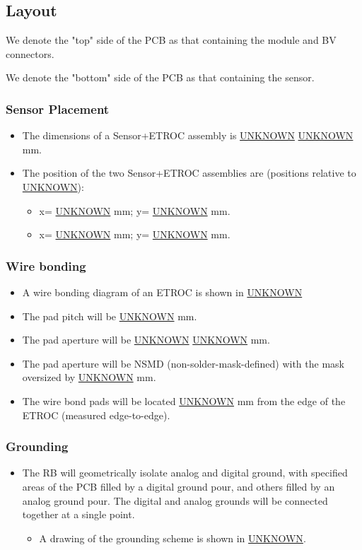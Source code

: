 \documentclass[11pt]{article}
\begin{document}
\subsection{Layout}
\label{sec:org73d1153}
We denote the "top" side of the PCB as that containing the module and BV connectors.

We denote the "bottom" side of the PCB as that containing the sensor.

\subsubsection{Sensor Placement}
\label{sec:org288d0c8}
\begin{itemize}
\item The dimensions of a Sensor+ETROC assembly is \uline{UNKNOWN} \texttimes{} \uline{UNKNOWN} mm.
\item The position of the two Sensor+ETROC assemblies are (positions relative to \uline{UNKNOWN}):
\begin{itemize}
\item x= \uline{UNKNOWN} mm;  y= \uline{UNKNOWN} mm.
\item x= \uline{UNKNOWN} mm;  y= \uline{UNKNOWN} mm.
\end{itemize}
\end{itemize}
\subsubsection{Wire bonding}
\label{sec:orgd302e17}
\begin{itemize}
\item A wire bonding diagram of an ETROC is shown in \uline{UNKNOWN}
\item The pad pitch will be \uline{UNKNOWN} mm.
\item The pad aperture will be \uline{UNKNOWN} \texttimes{} \uline{UNKNOWN} mm.
\item The pad aperture will be NSMD (non-solder-mask-defined) with the mask oversized by \uline{UNKNOWN} mm.
\item The wire bond pads will be located \uline{UNKNOWN} mm from the edge of the ETROC (measured edge-to-edge).
\end{itemize}
\subsubsection{Grounding}
\label{sec:org71da851}
\begin{itemize}
\item The RB will geometrically isolate analog and digital ground, with specified areas of the PCB filled by a digital ground pour, and others filled by an analog ground pour. The digital and analog grounds will be connected together at a single point.
\begin{itemize}
\item A drawing of the grounding scheme is shown in \uline{UNKNOWN}.
\end{itemize}
\end{itemize}
\end{document}
